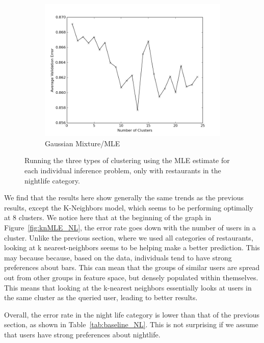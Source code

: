 \documentclass[11pt]{article}
\begin{document}
\begin{figure}[h!]
\begin{subfigure}[h!]{0.33\textwidth}
        \includegraphics[width=\textwidth]{NL_GM_mle.png}
        \caption{Gaussian Mixture/MLE}
        \label{fig:gmMLE_NL}
    \end{subfigure}
    \caption{Running the three types of clustering using the MLE estimate for each individual inference problem, only with restaurants in the nightlife category.}
    \label{fig:MLE_NL}
\end{figure}

We find that the results here show generally the same trends as the previous results, except the K-Neighbors model, which seems to be performing optimally at 8 clusters. We notice here that at the beginning of the graph in Figure~\ref{fig:knMLE_NL}, the error rate goes down with the number of users in a cluster. Unlike the previous section, where we used all categories of restaurants, looking at k nearest-neighbors seems to be helping make a better prediction. This may because because, based on the data, individuals tend to have strong preferences about bars. This can mean that the groups of similar users are spread out from other groups in feature space, but densely populated within themselves. This means that looking at the k-nearest neighbors essentially looks at users in the same cluster as the queried user, leading to better results.

Overall, the error rate in the night life category is lower than that of the previous section, as shown in Table~\ref{tab:baseline_NL}. This is not surprising if we assume that users have strong preferences about nightlife.
\end{document}
